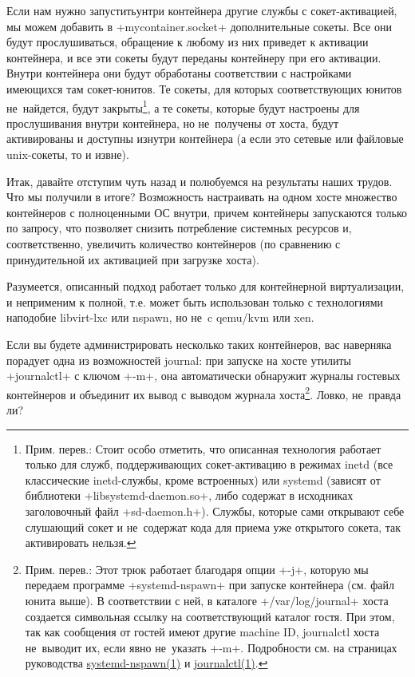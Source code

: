 \documentclass[10pt,oneside,a4paper]{article}
\begin{document}
Если нам нужно запуститьунтри контейнера другие службы с сокет-активацией, мы
можем добавить в +mycontainer.socket+ дополнительные сокеты. Все они будут
прослушиваться, обращение к любому из них приведет к активации контейнера, и все
эти сокеты будут переданы контейнеру при его активации. Внутри контейнера они
будут обработаны соответствии с настройками имеющихся там сокет-юнитов. Те
сокеты, для которых соответствующих юнитов не~найдется, будут
закрыты\footnote{Прим. перев.: Стоит особо отметить, что описанная технология
работает только для служб, поддерживающих сокет-активацию в режимах inetd (все
классические inetd-службы, кроме встроенных) или systemd (зависят от библиотеки
+libsystemd-daemon.so+, либо содержат в исходниках заголовочный файл
+sd-daemon.h+). Службы, которые сами открывают себе слушающий сокет и
не~содержат кода для приема уже открытого сокета, так активировать нельзя.}, а
те сокеты, которые будут настроены для прослушивания внутри контейнера, но
не~получены от хоста, будут активированы и доступны изнутри контейнера (а если
это сетевые или файловые unix-сокеты, то и извне).

Итак, давайте отступим чуть назад и полюбуемся на результаты наших трудов. Что
мы получили в итоге? Возможность настраивать на одном хосте множество
контейнеров с полноценными ОС внутри, причем контейнеры запускаются только по
запросу, что позволяет снизить потребление системных ресурсов и, соответственно,
увеличить количество контейнеров (по сравнению с принудительной их активацией
при загрузке хоста).

Разумеется, описанный подход работает только для контейнерной виртуализации, и
неприменим к полной, т.е. может быть использован только с технологиями наподобие
libvirt-lxc или nspawn, но не~c qemu/kvm или xen.

Если вы будете администрировать несколько таких контейнеров, вас наверняка
порадует одна из возможностей journal: при запуске на хосте утилиты +journalctl+
с ключом +-m+, она автоматически обнаружит журналы гостевых контейнеров и
объединит их вывод с выводом журнала хоста\footnote{Прим. перев.: Этот трюк
работает благодаря опции +-j+, которую мы передаем программе +systemd-nspawn+
при запуске контейнера (см. файл юнита выше). В соответствии с ней, в каталоге
+/var/log/journal+ хоста создается символьная ссылку на соответствующий каталог
гостя. При этом, так как сообщения от гостей имеют другие machine ID, journalctl
хоста не~выводит их, если явно не~указать +-m+. Подробности см. на страницах
руководства
\href{http://www.freedesktop.org/software/systemd/man/systemd-nspawn.html}{systemd-nspawn(1)}
и
\href{http://www.freedesktop.org/software/systemd/man/journalctl.html}{journalctl(1)}.}.
Ловко, не~правда ли?
\end{document}
